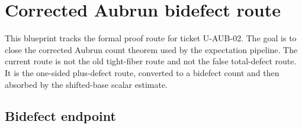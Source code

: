 \chapter{Corrected Aubrun bidefect route}

This blueprint tracks the formal proof route for ticket U-AUB-02.  The goal is
to close the corrected Aubrun count theorem used by the expectation pipeline.
The current route is not the old tight-fiber route and not the false
total-defect route.  It is the one-sided plus-defect route, converted to a
bidefect count and then absorbed by the shifted-base scalar estimate.

\section{Bidefect endpoint}

